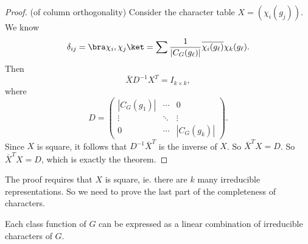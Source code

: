 \documentclass[a4paper]{article}
\begin{document}
\begin{proof}(of column orthogonality)
  Consider the character table $X = (\chi_i(g_j))$. We know
  \[
    \delta_{ij} = \bra \chi_i, \chi_j\ket = \sum \frac{1}{|C_G(g_\ell)|}\overline{\chi_i(g_\ell)} \chi_k(g_\ell).
  \]
  Then
  \[
    \bar{X} D^{-1} X^T = I_{k\times k},
  \]
  where
  \[
    D =
    \begin{pmatrix}
      |C_G(g_1)| & \cdots & 0\\
      \vdots & \ddots & \vdots\\
      0 & \cdots & |C_G(g_k)|
    \end{pmatrix}.
  \]
  Since $X$ is square, it follows that $D^{-1} \bar{X}^T$ is the inverse of $X$. So $\bar{X}^T X = D$. So $\bar{X}^T X = D$, which is exactly the theorem.
\end{proof}
The proof requires that $X$ is square, ie. there are $k$ many irreducible representations. So we need to prove the last part of the completeness of characters.

\begin{thm}
  Each class function of $G$ can be expressed as a linear combination of irreducible characters of $G$.
\end{thm}
\end{document}
